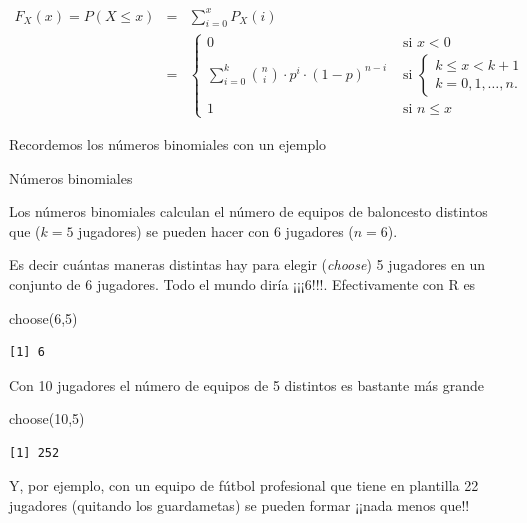 \documentclass[
  letterpaper,
  DIV=11,
  numbers=noendperiod]{scrreprt}
\newenvironment{Shaded}{\begin{snugshade}}{\end{snugshade}}
\newcommand{\DecValTok}[1]{\textcolor[rgb]{0.68,0.00,0.00}{#1}}
\newcommand{\FunctionTok}[1]{\textcolor[rgb]{0.28,0.35,0.67}{#1}}
\newcommand{\NormalTok}[1]{\textcolor[rgb]{0.00,0.23,0.31}{#1}}
\begin{document}
\begin{eqnarray*}
F_{X}(x)=P(X\leq x) & = & \sum_{i=0}^x P_X(i)\\
& = & 
\left\{
\begin{array}{ll}
0 & \mbox{ si } x<0\\\displaystyle
\sum_{i=0}^k {n\choose i}\cdot  p^i \cdot (1-p)^{n-i} & \mbox{ si } 
\left\{
  \begin{array}{l} 
  k\leq x< k+1\\
  k=0,1,\ldots,n.
  \end{array}
\right.\\
1 & \mbox{ si } n\leq x
\end{array}
\right.
\end{eqnarray*}

Recordemos los números binomiales con un ejemplo

Números binomiales

Los números binomiales calculan el número de equipos de baloncesto
distintos que (\(k=5\) jugadores) se pueden hacer con 6 jugadores
(\(n=6\)).

Es decir cuántas maneras distintas hay para elegir (\emph{choose}) 5
jugadores en un conjunto de 6 jugadores. Todo el mundo diría ¡¡¡6!!!.
Efectivamente con R es

\begin{Shaded}
\begin{Highlighting}[]
\FunctionTok{choose}\NormalTok{(}\DecValTok{6}\NormalTok{,}\DecValTok{5}\NormalTok{)}
\end{Highlighting}
\end{Shaded}

\begin{verbatim}
[1] 6
\end{verbatim}

Con 10 jugadores el número de equipos de 5 distintos es bastante más
grande

\begin{Shaded}
\begin{Highlighting}[]
\FunctionTok{choose}\NormalTok{(}\DecValTok{10}\NormalTok{,}\DecValTok{5}\NormalTok{)}
\end{Highlighting}
\end{Shaded}

\begin{verbatim}
[1] 252
\end{verbatim}

Y, por ejemplo, con un equipo de fútbol profesional que tiene en
plantilla 22 jugadores (quitando los guardametas) se pueden formar
¡¡nada menos que!!
\end{document}
